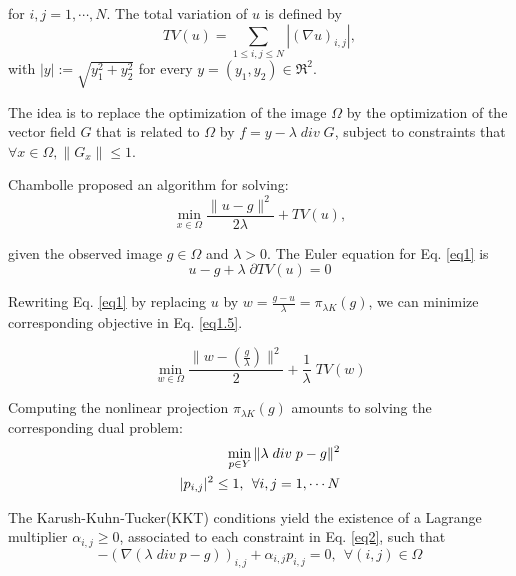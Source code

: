 \documentclass[11pt]{article}
\begin{document}
for $i,j = 1, \cdots, N$. The total variation of $u$ is defined by
\vspace{-5pt}
\begin{equation*}
TV(u)  = \sum\limits_{1 \le i,j \le N} | (\nabla u)_{i,j} |,
\end{equation*}
with $|y| := \sqrt{y_{1}^2 + y_{2}^2}$ for every $y = (y_1, y_2) \in \Re^2$.

\par The idea is to replace the optimization of the image $\Omega$ by the optimization of the vector field $G$ that is related to $\Omega$ by $f = y - \lambda \; div \; G$, subject to constraints that $\forall x \in \Omega,  \| G_x\| \le 1$.

\par Chambolle proposed an algorithm for solving: 
\vspace{-5pt}
\begin{equation}
 \min\limits_{x \in \Omega} \frac{ \| u - g\|^2 }{2\lambda} + TV(u),
 \label{eq1}
\end{equation}

given the observed image $g \in \Omega$ and $\lambda > 0$. The Euler equation for Eq. \ref{eq1} is 
\vspace{-5pt}
\begin{equation*}
u - g + \lambda \; \partial TV(u) = 0
\end{equation*}

Rewriting Eq. \ref{eq1} by replacing $u$ by $w = \frac{g-u}{\lambda} = \pi_{\lambda K}(g)$, we can minimize corresponding objective in Eq. \ref{eq1.5}.

\vspace{-5pt}
\begin{equation}
  \min\limits_{w \in \Omega} \frac{\| w - (\frac{g}{\lambda}) \|^2}{2} + \frac{1}{\lambda} \; TV(w)
  \label{eq1.5}
\end{equation}

Computing the nonlinear projection $\pi_{\lambda K}(g)$ amounts to solving the corresponding dual problem:
\vspace{-5pt}
\begin{eqnarray}
  \min\limits_{p \in Y} \| \lambda \; div \; p - g\|^2 \\
    |p_{i,j}|^2 \le 1, \: \: \forall i,j = 1, \cdots N \notag
 \label{eq2}
\end{eqnarray}

The Karush-Kuhn-Tucker(KKT) conditions yield the existence of a Lagrange multiplier $\alpha_{i,j} \ge 0$, associated to each constraint in Eq. \ref{eq2}, such that 
\vspace{-5pt}
\begin{equation*}
-(\nabla(\lambda \; div \; p - g))_{i,j} + \alpha_{i,j} p_{i,j} = 0, \: \: \forall (i,j) \in \Omega
\end{equation*}
\end{document}
